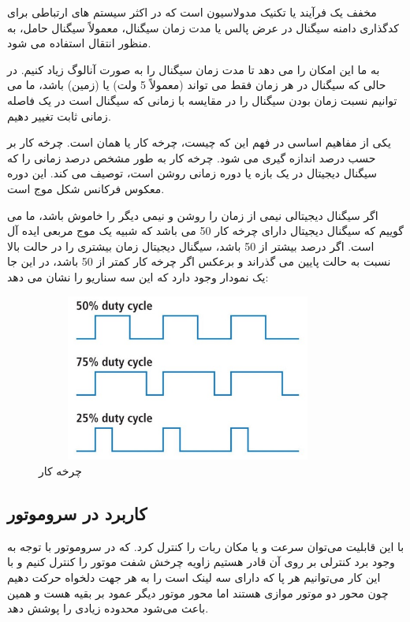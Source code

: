  مخفف  یک فرآیند یا تکنیک مدولاسیون است که
در اکثر سیستم های ارتباطی برای کدگذاری دامنه سیگنال در عرض پالس یا مدت زمان سیگنال، معمولاً سیگنال حامل، به منظور انتقال استفاده می شود.

 به ما این امکان را می دهد تا مدت زمان سیگنال را به صورت آنالوگ زیاد کنیم. در حالی که سیگنال در هر زمان فقط می تواند  (معمولاً 5 ولت) یا  (زمین) باشد، ما می توانیم نسبت زمان  بودن سیگنال را در مقایسه با زمانی که سیگنال  است در یک فاصله زمانی ثابت تغییر دهیم.

یکی از مفاهیم اساسی در فهم این که  چیست، چرخه کار یا همان  است. چرخه کار بر حسب درصد اندازه گیری می شود. چرخه کار به طور مشخص درصد زمانی را که سیگنال دیجیتال در یک بازه یا دوره زمانی روشن است، توصیف می کند. این دوره معکوس فرکانس شکل موج است.

اگر سیگنال دیجیتالی نیمی از زمان را روشن و نیمی دیگر را خاموش باشد، ما می گوییم که سیگنال دیجیتال دارای چرخه کار 50 می باشد که شبیه یک موج مربعی ایده آل است. اگر درصد بیشتر از 50 باشد، سیگنال دیجیتال زمان بیشتری را در حالت بالا نسبت به حالت پایین می گذراند و برعکس اگر چرخه کار کمتر از 50 باشد، در این جا یک نمودار وجود دارد که این سه سناریو را نشان می دهد:
    \begin{figure}[!h]
	\centering
	\includegraphics[height=5.5cm,width=10cm]{./Images/CH4/PWM_DutyCycle.jpg}
	\caption[چرخه کار]{چرخه کار}
	\label{چرخه کار}
	\end{figure}

\subsection{کاربرد  در سروموتور}
با این قابلیت می‌توان سرعت و یا مکان ربات را کنترل کرد. که در سروموتور با توجه به وجود برد کنترلی بر روی آن قادر هستیم زاویه چرخش شفت موتور را کنترل کنیم و با این کار می‌توانیم هر پا که دارای سه لینک است را به هر جهت دلخواه حرکت دهیم چون محور دو موتور موازی هستند اما محور موتور دیگر عمود بر بقیه هست و همین باعث می‌شود محدوده زیادی را پوشش دهد.

